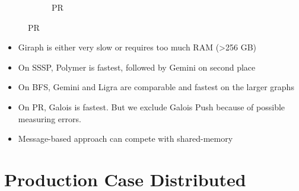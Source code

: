 \documentclass{meetings}
\begin{document}
\begin{figure}[h]
\begin{subfigure}{0.32\textwidth}
		\caption{PR}
	\end{subfigure}
\end{figure}
\begin{itemize}
	\item Giraph is either very slow or requires too much RAM (>256 GB)
	\item On SSSP, Polymer is fastest, followed by Gemini on second place
	\item On BFS, Gemini and Ligra are comparable and fastest on the larger graphs
	\item On PR, Galois is fastest. But we exclude Galois Push because of possible measuring errors.
	\item Message-based approach can compete with shared-memory
\end{itemize}


\section{Production Case Distributed}
\end{document}
